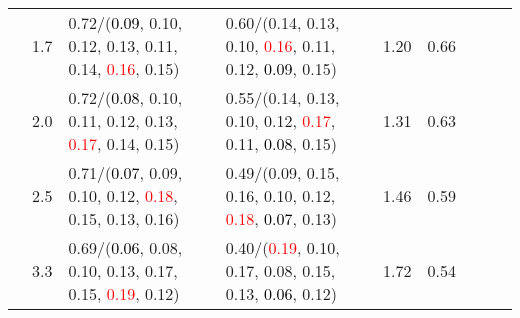 \documentclass[10pt,a4paper]{report}
\begin{document}
\begin{table}[!htbp]
\begin{center}
{\begin{tabular}{ccllccccc}
				  & 1.7                               & 0.72/(\textcolor{black}{0.09}, 0.10, 0.12, 0.13, 0.11, 0.14, \textcolor{red}{0.16}, 0.15)                                                                                                     & 0.60/(0.14, 0.13, 0.10, \textcolor{red}{0.16}, 0.11, 0.12, \textcolor{black}{0.09}, 0.15)                                                                                                     & 1.20             & 0.66                     \\
				  & 2.0                               & 0.72/(\textcolor{black}{0.08}, 0.10, 0.11, 0.12, 0.13, \textcolor{red}{0.17}, 0.14, 0.15)                                                                                                     & 0.55/(0.14, 0.13, 0.10, 0.12, \textcolor{red}{0.17}, 0.11, \textcolor{black}{0.08}, 0.15)                                                                                                     & 1.31             & 0.63                     \\
				  & 2.5                               & 0.71/(\textcolor{black}{0.07}, 0.09, 0.10, 0.12, \textcolor{red}{0.18}, 0.15, 0.13, 0.16)                                                                                                     & 0.49/(0.09, 0.15, 0.16, 0.10, 0.12, \textcolor{red}{0.18}, \textcolor{black}{0.07}, 0.13)                                                                                                     & 1.46             & 0.59                     \\
				  & 3.3                               & 0.69/(\textcolor{black}{0.06}, 0.08, 0.10, 0.13, 0.17, 0.15, \textcolor{red}{0.19}, 0.12)                                                                                                     & 0.40/(\textcolor{red}{0.19}, 0.10, 0.17, 0.08, 0.15, 0.13, \textcolor{black}{0.06}, 0.12)                                                                                                     & 1.72             & 0.54                     \\
				\bottomrule
			\end{tabular}}
	\end{center}
\end{table}
\end{document}
